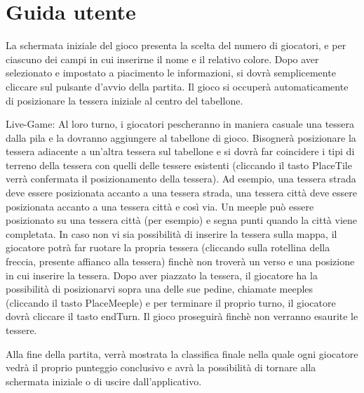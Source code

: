 \section{Guida utente}
La schermata iniziale del gioco presenta la scelta del numero di giocatori, e per ciascuno dei campi in cui inserirne il nome e il relativo colore. Dopo aver selezionato e impostato a piacimento le informazioni, si dovrà semplicemente cliccare sul pulsante d'avvio della partita. Il gioco si occuperà automaticamente di posizionare la tessera iniziale al centro del tabellone. 

Live-Game: Al loro turno, i giocatori pescheranno in maniera casuale una tessera dalla pila e la dovranno aggiungere al tabellone di gioco. Bisognerà posizionare la tessera adiacente a un'altra tessera sul tabellone e si dovrà far coincidere i tipi di terreno della tessera con quelli delle tessere esistenti (cliccando il tasto PlaceTile verrà confermata il posizionamento della tessera). Ad esempio, una tessera strada deve essere posizionata accanto a una tessera strada, una tessera città deve essere posizionata accanto a una tessera città e così via. Un meeple può essere posizionato su una tessera città (per esempio) e segna punti quando la città viene completata. In caso non vi sia possibilità di inserire la tessera sulla mappa, il giocatore potrà far ruotare la propria tessera (cliccando sulla rotellina della freccia, presente affianco alla tessera) finchè non troverà un verso e una posizione in cui inserire la tessera. Dopo aver piazzato la tessera, il giocatore ha la possibilità di posizionarvi sopra una delle sue pedine, chiamate meeples (cliccando il tasto PlaceMeeple) e per terminare il proprio turno, il giocatore dovrà cliccare il tasto endTurn. Il gioco proseguirà finchè non verranno esaurite le tessere.

Alla fine della partita, verrà mostrata la classifica finale nella quale ogni giocatore vedrà il proprio punteggio conclusivo e avrà la possibilità di tornare alla schermata iniziale o di uscire dall'applicativo. 